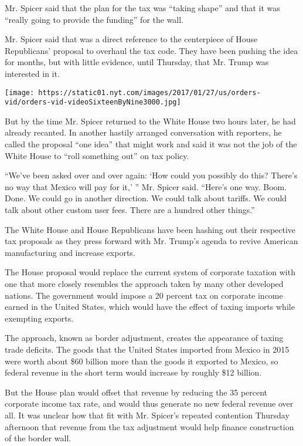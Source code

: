 Mr. Spicer said that the plan for the tax was ``taking shape'' and that
it was ``really going to provide the funding'' for the wall.

Mr. Spicer said that was a direct reference to the centerpiece of House
Republicans' proposal to overhaul the tax code. They have been pushing
the idea for months, but with little evidence, until Thursday, that Mr.
Trump was interested in it.

\texttt{[image: https://static01.nyt.com/images/2017/01/27/us/orders-vid/orders-vid-videoSixteenByNine3000.jpg]}

But by the time Mr. Spicer returned to the White House two hours later,
he had already recanted. In another hastily arranged conversation with
reporters, he called the proposal ``one idea'' that might work and said
it was not the job of the White House to ``roll something out'' on tax
policy.

``We've been asked over and over again: `How could you possibly do this?
There's no way that Mexico will pay for it,' '' Mr. Spicer said.
``Here's one way. Boom. Done. We could go in another direction. We could
talk about tariffs. We could talk about other custom user fees. There
are a hundred other things.''

The White House and House Republicans have been hashing out their
respective tax proposals as they press forward with Mr. Trump's agenda
to revive American manufacturing and increase exports.

The House proposal would replace the current system of corporate
taxation with one that more closely resembles the approach taken by many
other developed nations. The government would impose a 20 percent tax on
corporate income earned in the United States, which would have the
effect of taxing imports while exempting exports.

The approach, known as border adjustment, creates the appearance of
taxing trade deficits. The goods that the United States imported from
Mexico in 2015 were worth about \$60 billion more than the goods it
exported to Mexico, so federal revenue in the short term would increase
by roughly \$12 billion.

But the House plan would offset that revenue by reducing the 35 percent
corporate income tax rate, and would thus generate no new federal
revenue over all. It was unclear how that fit with Mr. Spicer's repeated
contention Thursday afternoon that revenue from the tax adjustment would
help finance construction of the border wall.

